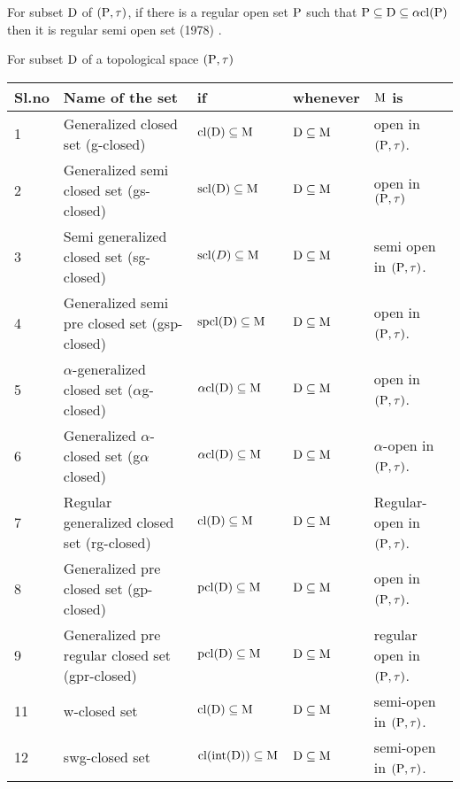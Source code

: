 \begin{dfn}\label{dfn1.2.6}
For subset $\mathrm{D}$ of $(\mathrm{P}, \tau)$, if there is a regular open set $\mathrm{P}$ such that $\mathrm{P} \subseteq \mathrm{D} \subseteq \alpha \mathrm{cl}(\mathrm{P})$ then it is regular semi open set (1978) \cite{Cameron}. 
\end{dfn}

\begin{dfn}\label{dfn1.2.7}
For subset $\mathrm{D}$ of a topological space $(\mathrm{P}, \tau)$ 
\end{dfn}

{\fontsize{10}{12}\selectfont
\begin{longtable}{@{}|p{.9cm}|>{\raggedright}p{5cm}|>{\centering}p{2.5cm}|>{\centering}p{1.7cm}|>{\centering}p{2.8cm}|@{}}
\hline
\textbf{Sl.no} & \textbf{Name of the set} & \textbf{if} & \textbf{whenever} & {\boldmath $\mathrm{M}$} \textbf{is}\tabularnewline
\hline
1 & Generalized closed set (g-closed) \cite{Levine} & $\mathrm{cl}(\mathrm{D}) \subseteq \mathrm{M}$ & $\mathrm{D} \subseteq \mathrm{M}$ & open in $(\mathrm{P}, \tau)$.\tabularnewline
\hline
2 & Generalized semi closed set (gs-closed) \cite{Arya} & $\mathrm{scl}(\mathrm{D}) \subseteq \mathrm{M}$ & $\mathrm{D} \subseteq \mathrm{M}$ & open in $(\mathrm{P}, \tau)$\tabularnewline
\hline
3 & Semi generalized closed set (sg-closed) \cite{Bhattacharyya} & $\mathrm{scl}(D) \subseteq \mathrm{M}$ & $\mathrm{D} \subseteq \mathrm{M}$ & semi open in $(\mathrm{P}, \tau)$.\tabularnewline
\hline
4 & Generalized semi pre closed set (gsp-closed) \cite{Dontchev} & $\mathrm{spcl}(\mathrm{D}) \subseteq \mathrm{M}$ & $\mathrm{D} \subseteq \mathrm{M}$ & open in $(\mathrm{P}, \tau)$.\tabularnewline
\hline
5 & $\alpha$-generalized closed set ($\alpha$g-closed) \cite{Maki3} & $\alpha\mathrm{cl}(\mathrm{D}) \subseteq \mathrm{M}$ & $\mathrm{D}\subseteq\mathrm{M}$ & open in $(\mathrm{P}, \tau)$.\tabularnewline
\hline
6 & Generalized $\alpha$-closed set (g$\alpha$ closed) \cite{Maki3} & $\alpha\mathrm{cl}(\mathrm{D}) \subseteq \mathrm{M}$ & $\mathrm{D}\subseteq\mathrm{M}$ & $\alpha$-open in $(\mathrm{P}, \tau)$.\tabularnewline
\hline
7 & Regular generalized closed set (rg-closed) \cite{Palaniappan} & $\mathrm{cl}(\mathrm{D}) \subseteq \mathrm{M}$ & $\mathrm{D} \subseteq \mathrm{M}$ & Regular-open in $(\mathrm{P}, \tau)$.\tabularnewline
\hline
8 & Generalized pre closed set (gp-closed) \cite{Noiri1} & $\mathrm{pcl}(\mathrm{D}) \subseteq \mathrm{M}$ & $\mathrm{D} \subseteq \mathrm{M}$ & open in $(\mathrm{P}, \tau)$.\tabularnewline
\hline
9 & Generalized pre regular closed set (gpr-closed) \cite{Gnanambal} & $\mathrm{pcl}(\mathrm{D}) \subseteq \mathrm{M}$ & $\mathrm{D} \subseteq \mathrm{M}$ & regular open in $(\mathrm{P}, \tau)$.\tabularnewline
\hline
11 & w-closed set \cite{Sheik} & $\mathrm{cl}(\mathrm{D}) \subseteq \mathrm{M}$ & $\mathrm{D} \subseteq \mathrm{M}$ & semi-open in $(\mathrm{P}, \tau)$.\tabularnewline
\hline
12 & swg-closed set \cite{Nagaveni6} & $\mathrm{cl}(\mbox{int}(\mathrm{D})) \subseteq \mathrm{M}$ & $\mathrm{D} \subseteq \mathrm{M}$ & semi-open in $(\mathrm{P}, \tau)$.\tabularnewline

\end{longtable}}
